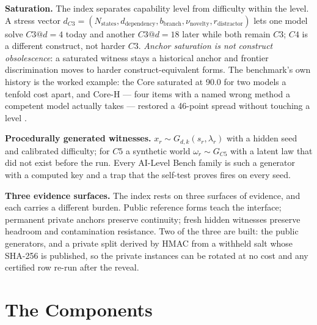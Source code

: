 \textbf{Saturation.} The index separates capability level from difficulty within the level. A stress vector $d_{C3} = (N_{\mathrm{states}}, d_{\mathrm{dependency}}, b_{\mathrm{branch}}, \nu_{\mathrm{novelty}}, r_{\mathrm{distractor}})$ lets one model solve $C3@d{=}4$ today and another $C3@d{=}18$ later while both remain $C3$; $C4$ is a different construct, not harder $C3$. \emph{Anchor saturation is not construct obsolescence}: a saturated witness stays a historical anchor and frontier discrimination moves to harder construct-equivalent forms. The benchmark's own history is the worked example: the Core saturated at 90.0 for two models a tenfold cost apart, and Core-H --- four items with a named wrong method a competent model actually takes --- restored a 46-point spread without touching a level \citep{yang2026hilbenchpaper}.

\textbf{Procedurally generated witnesses.} $x_r \sim G_{d,k}(s_r, \lambda_r)$ with a hidden seed and calibrated difficulty; for $C5$ a synthetic world $\omega_r \sim G_{C5}$ with a latent law that did not exist before the run. Every AI-Level Bench family is such a generator with a computed key and a trap that the self-test proves fires on every seed.

\textbf{Three evidence surfaces.} The index rests on three surfaces of evidence, and each
carries a different burden. Public reference forms teach the interface; permanent private anchors preserve continuity; fresh hidden witnesses preserve headroom and contamination resistance. Two of the three are built: the public generators, and a private split derived by HMAC from a withheld salt whose SHA-256 is published, so the private instances can be rotated at no cost and any certified row re-run after the reveal.

\section{The Components}\label{sec:components}

